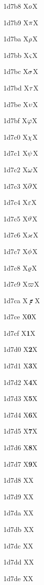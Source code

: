 \documentclass[11pt]{article}
\begin{document}
1d7b8 X{\ensuremath{\mathsfbfsl{o}}}X

1d7b9 X{\ensuremath{\mathsfbfsl{\pi}}}X

1d7ba X{\ensuremath{\mathsfbfsl{\rho}}}X

1d7bb X{\ensuremath{\mathsfbfsl{\varsigma}}}X

1d7bc X{\ensuremath{\mathsfbfsl{\sigma}}}X

1d7bd X{\ensuremath{\mathsfbfsl{\tau}}}X

1d7be X{\ensuremath{\mathsfbfsl{\upsilon}}}X

1d7bf X{\ensuremath{\mathsfbfsl{\varphi}}}X

1d7c0 X{\ensuremath{\mathsfbfsl{\chi}}}X

1d7c1 X{\ensuremath{\mathsfbfsl{\psi}}}X

1d7c2 X{\ensuremath{\mathsfbfsl{\omega}}}X

1d7c3 X{\ensuremath{\mathsfbfsl{\partial}}}X

1d7c4 X{\ensuremath{\mathsfbfsl{\varepsilon}}}X

1d7c5 X{\ensuremath{\mathsfbfsl{\vartheta}}}X

1d7c6 X{\ensuremath{\mathsfbfsl{\varkappa}}}X

1d7c7 X{\ensuremath{\mathsfbfsl{\phi}}}X

1d7c8 X{\ensuremath{\mathsfbfsl{\varrho}}}X

1d7c9 X{\ensuremath{\mathsfbfsl{\varpi}}}X

1d7ca X{\ensuremath{\mathbf{\digamma}}}X

1d7ce X{\textbf{0}}X

1d7cf X{\textbf{1}}X

1d7d0 X{\textbf{2}}X

1d7d1 X{\textbf{3}}X

1d7d2 X{\textbf{4}}X

1d7d3 X{\textbf{5}}X

1d7d4 X{\textbf{6}}X

1d7d5 X{\textbf{7}}X

1d7d6 X{\textbf{8}}X

1d7d7 X{\textbf{9}}X

1d7d8 X{}X

1d7d9 X{}X

1d7da X{}X

1d7db X{}X

1d7dc X{}X

1d7dd X{}X

1d7de X{}X
\end{document}
